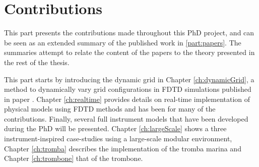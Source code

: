 \chapter*{Contributions}
This part presents the contributions made throughout this PhD project, and can be seen as an extended summary of the published work in \ref{part:papers}. The summaries attempt to relate the content of the papers to the theory presented in the rest of the thesis. 

This part starts by introducing the dynamic grid in Chapter \ref{ch:dynamicGrid}, a method to dynamically vary grid configurations in FDTD simulations published in paper \citeP[G]. Chapter \ref{ch:realtime} provides details on real-time implementation of physical models using FDTD methods and has been for many of the contributions. 
Finally, several full instrument models that have been developed during the PhD will be presented. Chapter \ref{ch:largeScale} shows a three instrument-inspired case-studies using a large-scale modular environment, Chapter \ref{ch:tromba} describes the implementation of the tromba marina and Chapter \ref{ch:trombone} that of the trombone.

